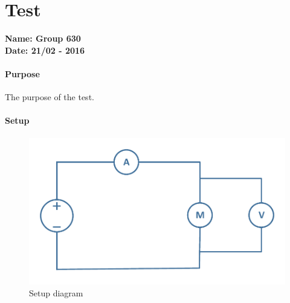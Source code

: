 \chapter{Test} \label{test} %
\textbf{Name: Group 630}\\  %
\textbf{Date: 21/02 - 2016}

\subsubsection{Purpose}
The purpose of the test.

\subsubsection{Setup}
\begin{figure}[H]
  \centering
	\includegraphics[scale=.45]{figures/MotorTest1.pdf}  %
	\caption{Setup diagram}                              %
\end{figure}\vspace{-5mm}                              %

